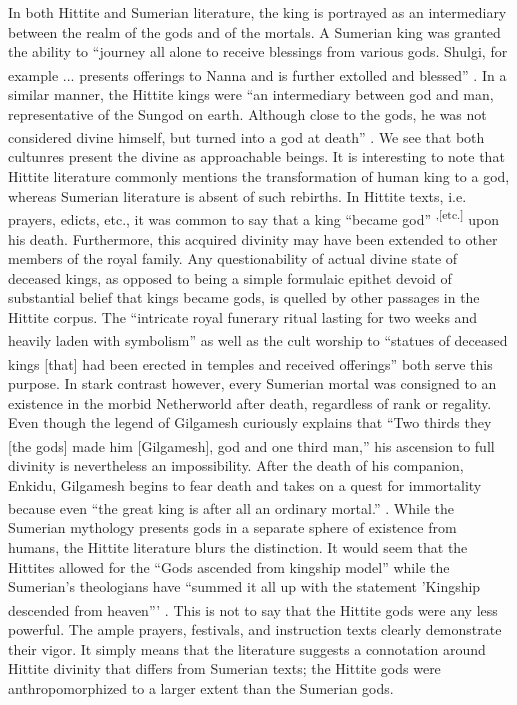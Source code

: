 In both Hittite and Sumerian literature, the king is portrayed as an
intermediary between the realm of the gods and of the mortals.  A
Sumerian king was granted the ability to ``journey all alone to
receive blessings from various gods. Shulgi, for example ... presents
offerings to Nanna and is further extolled and
blessed'' \textsuperscript{\cite[p.63]{Kramer}}.  In a similar manner,
the Hittite kings were ``an intermediary between god and man,
representative of the Sungod on earth. Although close to the gods, he
was not considered divine himself, but turned into a god at
death'' \textsuperscript{\cite[p.38]{van_death}}. We see that both
cultunres present the divine as approachable beings.  It is
interesting to note that Hittite literature commonly mentions the
transformation of human king to a god, whereas Sumerian literature is
absent of such rebirths. In Hittite texts, i.e. prayers, edicts, etc.,
it was common to say that a king ``became
god'' \textsuperscript{\cite[p.75,95,98]
{singer},\cite[p.196]{van}[etc.]} upon his death.
Furthermore, this acquired divinity may have been extended to other
members of the royal family.  Any questionability of actual divine
state of deceased kings, as opposed to being a simple formulaic
epithet devoid of substantial belief that kings became gods, is
quelled by other passages in the Hittite corpus. The ``intricate royal
funerary ritual lasting for two weeks and heavily laden with
symbolism'' \textsuperscript{\cite[p.38]{van_death}} as well as the
cult worship to ``statues of deceased kings [that] had been erected in
temples and received
offerings'' \textsuperscript{\cite[p.45]{van_death}} both serve this
purpose.
In stark contrast however, every Sumerian mortal was consigned to an
existence in the morbid Netherworld after death, regardless of rank or
regality.
Even though the legend of Gilgamesh curiously explains that ``Two
thirds they [the gods] made him [Gilgamesh], god and one third
man,''  \textsuperscript{\cite[p77]{george}} his ascension to full divinity is
nevertheless an impossibility.
After the death of his companion, Enkidu, Gilgamesh begins to fear
death and takes on a quest for immortality because even ``the great king is
after all an ordinary mortal.'' \textsuperscript{\cite[p.47]{george}}. 
While the Sumerian mythology presents gods in a separate sphere of
existence from humans, the Hittite literature blurs the distinction. 
It would seem that the Hittites allowed for the ``Gods ascended from
kingship model'' while the Sumerian's theologians have ``summed it all
up with the statement 'Kingship descended from
heaven''' \textsuperscript{\cite[p.50]{kramer}}.
This is not to say that the Hittite gods were any less powerful.  The
ample prayers, festivals, and instruction texts clearly demonstrate
their vigor.  It simply means that the literature suggests a
connotation around Hittite divinity that differs from Sumerian texts;
the Hittite gods were anthropomorphized to a larger extent than the
Sumerian gods.

